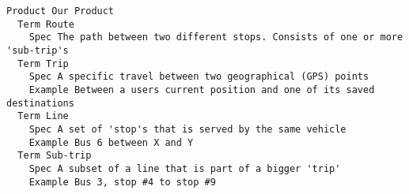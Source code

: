 
\begin{lstlisting}
Product Our Product
  Term Route
    Spec The path between two different stops. Consists of one or more 'sub-trip's
  Term Trip
    Spec A specific travel between two geographical (GPS) points
    Example Between a users current position and one of its saved destinations
  Term Line
    Spec A set of 'stop's that is served by the same vehicle
    Example Bus 6 between X and Y
  Term Sub-trip
    Spec A subset of a line that is part of a bigger 'trip'
    Example Bus 3, stop #4 to stop #9

\end{lstlisting}